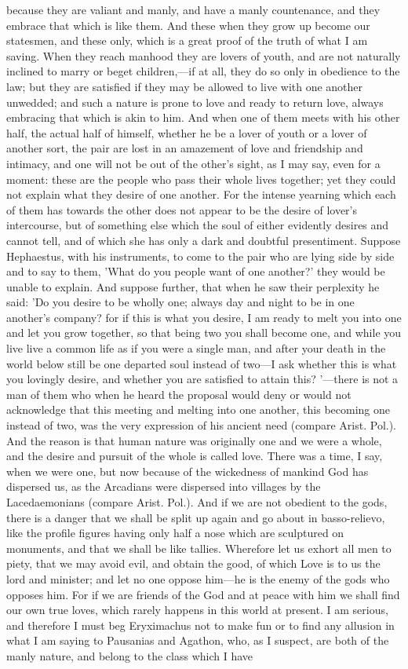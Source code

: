 \documentclass[11pt,letter]{article}
\begin{document}
because they are valiant and manly, and have a manly countenance, and they embrace that which is like them. And these when they grow up become our statesmen, and these only, which is a great proof of the truth of what I am saving. When they reach manhood they are lovers of youth, and are not naturally inclined to marry or beget children,—if at all, they do so only in obedience to the law; but they are satisfied if they may be allowed to live with one another unwedded; and such a nature is prone to love and ready to return love, always embracing that which is akin to him. And when one of them meets with his other half, the actual half of himself, whether he be a lover of youth or a lover of another sort, the pair are lost in an amazement of love and friendship and intimacy, and one will not be out of the other's sight, as I may say, even for a moment: these are the people who pass their whole lives together; yet they could not explain what they desire of one another. For the intense yearning which each of them has towards the other does not appear to be the desire of lover's intercourse, but of something else which the soul of either evidently desires and cannot tell, and of which she has only a dark and doubtful presentiment. Suppose Hephaestus, with his instruments, to come to the pair who are lying side by side and to say to them, 'What do you people want of one another?' they would be unable to explain. And suppose further, that when he saw their perplexity he said: 'Do you desire to be wholly one; always day and night to be in one another's company? for if this is what you desire, I am ready to melt you into one and let you grow together, so that being two you shall become one, and while you live live a common life as if you were a single man, and after your death in the world below still be one departed soul instead of two—I ask whether this is what you lovingly desire, and whether you are satisfied to attain this? '—there is not a man of them who when he heard the proposal would deny or would not acknowledge that this meeting and melting into one another, this becoming one instead of two, was the very expression of his ancient need (compare Arist. Pol.). And the reason is that human nature was originally one and we were a whole, and the desire and pursuit of the whole is called love. There was a time, I say, when we were one, but now because of the wickedness of mankind God has dispersed us, as the Arcadians were dispersed into villages by the Lacedaemonians (compare Arist. Pol.). And if we are not obedient to the gods, there is a danger that we shall be split up again and go about in basso-relievo, like the profile figures having only half a nose which are sculptured on monuments, and that we shall be like tallies. Wherefore let us exhort all men to piety, that we may avoid evil, and obtain the good, of which Love is to us the lord and minister; and let no one oppose him—he is the enemy of the gods who opposes him. For if we are friends of the God and at peace with him we shall find our own true loves, which rarely happens in this world at present. I am serious, and therefore I must beg Eryximachus not to make fun or to find any allusion in what I am saying to Pausanias and Agathon, who, as I suspect, are both of the manly nature, and belong to the class which I have 
\end{document}
